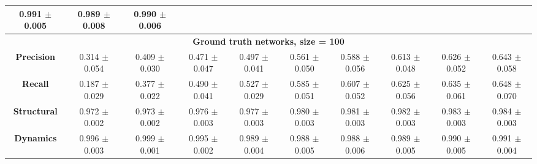\begin{table}[h!]
\begin{tabular}{|c|c|c|c|c|c|c|c|c|c|}
\makecell{0.991 \\ $\pm$0.005} & \makecell{0.989 \\ $\pm$0.008} & \makecell{0.990 \\ $\pm$0.006} \\
\hline
\multicolumn{10}{|c|}{\textbf{Ground truth networks, size = 100}} \\
\hline
\textbf{Precision} & \makecell{0.314\\$\pm$0.054} & \makecell{0.409\\$\pm$0.030} & \makecell{0.471\\$\pm$0.047} & \makecell{0.497\\$\pm$0.041} & \makecell{0.561\\$\pm$0.050} & \makecell{0.588\\$\pm$0.056} & \makecell{0.613\\$\pm$0.048} & \makecell{0.626\\$\pm$0.052} & \makecell{0.643\\$\pm$0.058} \\
\textbf{Recall} & \makecell{0.187\\$\pm$0.029} & \makecell{0.377\\$\pm$0.022} & \makecell{0.490\\$\pm$0.041} & \makecell{0.527\\$\pm$0.029} & \makecell{0.585\\$\pm$0.051} & \makecell{0.607\\$\pm$0.052} & \makecell{0.625\\$\pm$0.056} & \makecell{0.635\\$\pm$0.061} & \makecell{0.648\\$\pm$0.070} \\
\textbf{Structural} & \makecell{0.972\\$\pm$0.002} & \makecell{0.973\\$\pm$0.002} & \makecell{0.976\\$\pm$0.003} & \makecell{0.977\\$\pm$0.003} & \makecell{0.980\\$\pm$0.003} & \makecell{0.981\\$\pm$0.003} & \makecell{0.982\\$\pm$0.003} & \makecell{0.983\\$\pm$0.003} & \makecell{0.984\\$\pm$0.003} \\
\textbf{Dynamics} & \makecell{0.996\\$\pm$0.003} & \makecell{0.999\\$\pm$0.001} & \makecell{0.995\\$\pm$0.002} & \makecell{0.989\\$\pm$0.004} & \makecell{0.988\\$\pm$0.005} & \makecell{0.988\\$\pm$0.006} & \makecell{0.989\\$\pm$0.005} & \makecell{0.990\\$\pm$0.005} & \makecell{0.991\\$\pm$0.004} \\

\end{tabular}
\end{table}
